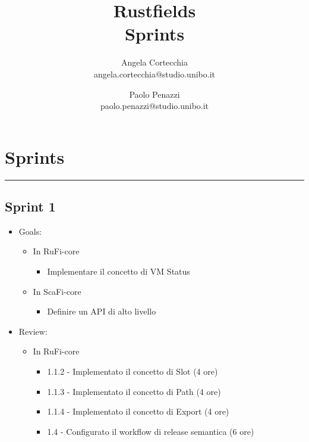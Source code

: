 \documentclass[12pt, a4paper]{article}
\title{\LARGE
    Rustfields \\ 
    \small
    Sprints
    }
\author{
    Angela Cortecchia \\ 
    \small 
    angela.cortecchia@studio.unibo.it
    \and
    Paolo Penazzi \\ 
    \small
    paolo.penazzi@studio.unibo.it
}
\date{\small }
\begin{document}
\maketitle
\newpage

\section*{Sprints}

\par\noindent\rule{\textwidth}{0.5pt}

\subsection*{Sprint 1}

\begin{itemize}
    \item Goals:
          \begin{itemize}
              \color{teal}
              \item In RuFi-core
                    \begin{itemize}
                        \item Implementare il concetto di VM Status
                    \end{itemize}
                    \color{cyan}
              \item In ScaFi-core
                    \begin{itemize}
                        \item Definire un API di alto livello
                    \end{itemize}
          \end{itemize}
    \item Review:
          \begin{itemize}
              \color{teal}
              \item In RuFi-core
                    \begin{itemize}
                        \item 1.1.2 - Implementato il concetto di Slot (4 ore)
                        \item 1.1.3 - Implementato il concetto di Path (4 ore)
                        \item 1.1.4 - Implementato il concetto di Export (4 ore)
                        \item 1.4 - Configurato il workflow di release semantica (6 ore)
                    \end{itemize}

\end{itemize}
\end{itemize}
\end{document}
